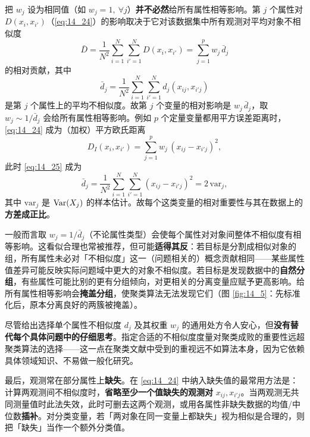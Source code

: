 \begin{remark}[等权重不等于等影响]
把 $w_j$ 设为相同值（如 $w_j=1,\ \forall j$）\textbf{并不必然}给所有属性相等影响。第 $j$ 个属性对 $D(x_i,x_{i'})$（\eqref{eq:14_24}）的影响取决于它对该数据集中所有观测对平均对象不相似度
\[
\bar D = \frac{1}{N^2}\sum_{i=1}^{N}\sum_{i'=1}^{N} D(x_i,x_{i'}) = \sum_{j=1}^{p} w_j\,\bar d_j
\]
的相对贡献，其中
\begin{equation}
\bar d_j = \frac{1}{N^2}\sum_{i=1}^{N}\sum_{i'=1}^{N} d_j(x_{ij},x_{i'j}) \label{eq:14_25}
\end{equation}
是第 $j$ 个属性上的平均不相似度。故第 $j$ 个变量的相对影响是 $w_j\,\bar d_j$，取 $w_j\sim 1/\bar d_j$ 会给所有属性相等影响。例如 $p$ 个定量变量都用平方误差距离时，\eqref{eq:14_24} 成为（加权）平方欧氏距离
\begin{equation}
D_I(x_i,x_{i'}) = \sum_{j=1}^{p} w_j\,(x_{ij}-x_{i'j})^2, \label{eq:14_26}
\end{equation}
此时 \eqref{eq:14_25} 成为
\begin{equation}
\bar d_j = \frac{1}{N^2}\sum_{i=1}^{N}\sum_{i'=1}^{N} (x_{ij}-x_{i'j})^2 = 2\,\mathrm{var}_j, \label{eq:14_27}
\end{equation}
其中 $\mathrm{var}_j$ 是 $\mathrm{Var}(X_j)$ 的样本估计。故每个这类变量的相对重要性与其在数据上的\textbf{方差成正比}。

一般而言取 $w_j=1/\bar d_j$（不论属性类型）会使每个属性对对象间整体不相似度有相等影响。这看似合理也常被推荐，但可能\textbf{适得其反}：若目标是分割成相似对象的组，所有属性未必对「不相似度」这一（问题相关的）概念贡献相同——某些属性值差异可能反映实际问题域中更大的对象不相似度。若目标是发现数据中的\textbf{自然分组}，有些属性可能比别的更有分组倾向，对更相关的分离变量应赋予更高影响。给所有属性相等影响会\textbf{掩盖分组}，使聚类算法无法发现它们（图 \ref{fig:14_5}：先标准化后，原本分离良好的两簇被掩盖）。

尽管给出选择单个属性不相似度 $d_j$ 及其权重 $w_j$ 的通用处方令人安心，但\textbf{没有替代每个具体问题中的仔细思考}。指定合适的不相似度度量对聚类成败的重要性远超聚类算法的选择——这一点在聚类文献中受到的重视远不如算法本身，因为它依赖具体领域知识、不易做一般化研究。
\end{remark}

最后，观测常在部分属性上\textbf{缺失}。在 \eqref{eq:14_24} 中纳入缺失值的最常用方法是：计算两观测间不相似度时，\textbf{省略至少一个值缺失的观测对} $x_{ij},x_{i'j}$。当两观测无共同测量值时此法失效，此时可删去这两个观测，或用各属性非缺失数据的均值/中位数\textbf{插补}。对分类变量，若「两对象在同一变量上都缺失」视为相似是合理的，则把「缺失」当作一个额外分类值。

